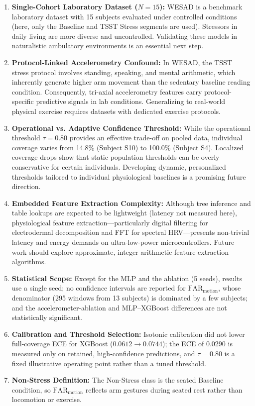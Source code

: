 \documentclass[conference]{IEEEtran}
\begin{document}
\begin{enumerate}
    \item \textbf{Single-Cohort Laboratory Dataset ($N=15$):} WESAD is a benchmark laboratory dataset with 15 subjects evaluated under controlled conditions (here, only the Baseline and TSST Stress segments are used). Stressors in daily living are more diverse and uncontrolled. Validating these models in naturalistic ambulatory environments is an essential next step.
    \item \textbf{Protocol-Linked Accelerometry Confound:} In WESAD, the TSST stress protocol involves standing, speaking, and mental arithmetic, which inherently generate higher arm movement than the sedentary baseline reading condition. Consequently, tri-axial accelerometry features carry protocol-specific predictive signals in lab conditions. Generalizing to real-world physical exercise requires datasets with dedicated exercise protocols.
    \item \textbf{Operational vs. Adaptive Confidence Threshold:} While the operational threshold $\tau = 0.80$ provides an effective trade-off on pooled data, individual coverage varies from 14.8\% (Subject S10) to 100.0\% (Subject S4). Localized coverage drops show that static population thresholds can be overly conservative for certain individuals. Developing dynamic, personalized thresholds tailored to individual physiological baselines is a promising future direction.
    \item \textbf{Embedded Feature Extraction Complexity:} Although tree inference and table lookups are expected to be lightweight (latency not measured here), physiological feature extraction—particularly digital filtering for electrodermal decomposition and FFT for spectral HRV—presents non-trivial latency and energy demands on ultra-low-power microcontrollers. Future work should explore approximate, integer-arithmetic feature extraction algorithms.
    \item \textbf{Statistical Scope:} Except for the MLP and the ablation (5 seeds), results use a single seed; no confidence intervals are reported for $\text{FAR}_{\text{motion}}$, whose denominator (295 windows from 13 subjects) is dominated by a few subjects; and the accelerometer-ablation and MLP--XGBoost differences are not statistically significant.
    \item \textbf{Calibration and Threshold Selection:} Isotonic calibration did not lower full-coverage ECE for XGBoost ($0.0612\rightarrow0.0744$); the ECE of $0.0290$ is measured only on retained, high-confidence predictions, and $\tau=0.80$ is a fixed illustrative operating point rather than a tuned threshold.
    \item \textbf{Non-Stress Definition:} The Non-Stress class is the seated Baseline condition, so $\text{FAR}_{\text{motion}}$ reflects arm gestures during seated rest rather than locomotion or exercise.
\end{enumerate}
\end{document}
